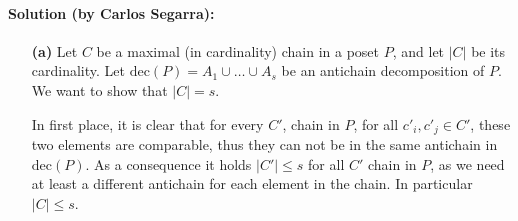 \documentclass{amsart}
\theoremstyle{plain}
\begin{document}
\paragraph{\textbf{Solution (by Carlos Segarra):}} 
\begin{enumerate}
    \item[\textbf{(a)}] 
        Let $C$ be a maximal (in cardinality) chain in a poset $P$, and let $|C|$ be its cardinality.
        Let $\text{dec}(P) = A_1 \cup \dots \cup A_s$ be an antichain decomposition of $P$.
        We want to show that $|C| = s$.

        In first place, it is clear that for every $C'$, chain in $P$, for all $c'_i, c'_j \in C'$, these two elements are comparable, thus they can not be in the same antichain in $\text{dec}(P)$.
        As a consequence it holds $|C'| \leq s$ for all $C'$ chain in $P$, as we need at least a different antichain for each element in the chain.
        In particular $|C| \leq s$. 


\end{enumerate}
\end{document}
